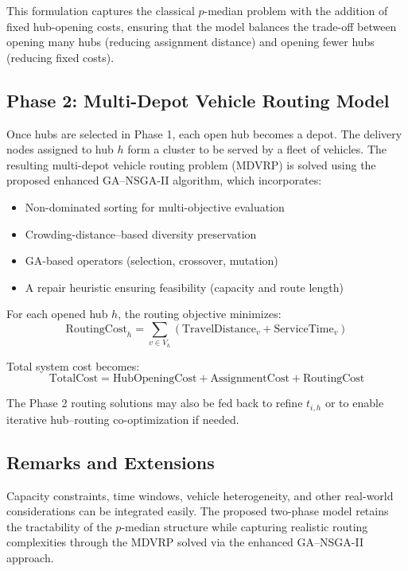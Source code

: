 \documentclass[conference]{IEEEtran}
\begin{document}
This formulation captures the classical $p$-median problem with the addition of fixed hub-opening costs, ensuring that the model balances the trade-off between opening many hubs (reducing assignment distance) and opening fewer hubs (reducing fixed costs).

\subsection{Phase 2: Multi-Depot Vehicle Routing Model}

Once hubs are selected in Phase 1, each open hub becomes a depot. The delivery nodes assigned to hub $h$ form a cluster to be served by a fleet of vehicles. The resulting multi-depot vehicle routing problem (MDVRP) is solved using the proposed enhanced GA–NSGA-II algorithm, which incorporates:

\begin{itemize}
    \item Non-dominated sorting for multi-objective evaluation
    \item Crowding-distance–based diversity preservation
    \item GA-based operators (selection, crossover, mutation)
    \item A repair heuristic ensuring feasibility (capacity and route length)
\end{itemize}

For each opened hub $h$, the routing objective minimizes:
\[
\text{RoutingCost}_h = 
\sum_{v \in V_h} 
\left( 
\text{TravelDistance}_{v} + 
\text{ServiceTime}_{v}
\right)
\]

Total system cost becomes:
\[
\text{TotalCost} = 
\text{HubOpeningCost} + 
\text{AssignmentCost} + 
\text{RoutingCost}
\]

The Phase 2 routing solutions may also be fed back to refine $t_{i,h}$ or to enable iterative hub–routing co-optimization if needed.

\subsection{Remarks and Extensions}

Capacity constraints, time windows, vehicle heterogeneity, and other real-world considerations can be integrated easily. The proposed two-phase model retains the tractability of the $p$-median structure while capturing realistic routing complexities through the MDVRP solved via the enhanced GA–NSGA-II approach.
\end{document}
